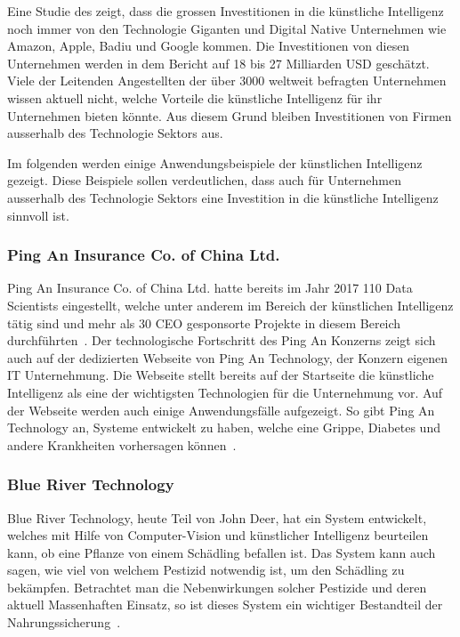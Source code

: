 Eine Studie des \textcite{Bughin} zeigt, dass die grossen Investitionen in die künstliche Intelligenz noch immer von den Technologie Giganten und Digital Native Unternehmen wie Amazon, Apple, Badiu und Google kommen. Die Investitionen von diesen Unternehmen werden in dem Bericht auf 18 bis 27 Milliarden USD geschätzt. Viele der Leitenden Angestellten der über 3000 weltweit befragten Unternehmen wissen aktuell nicht, welche Vorteile die künstliche Intelligenz für ihr Unternehmen bieten könnte. Aus diesem Grund bleiben Investitionen von Firmen ausserhalb des Technologie Sektors aus.

Im folgenden werden einige Anwendungsbeispiele der künstlichen Intelligenz gezeigt. Diese Beispiele sollen verdeutlichen, dass auch für Unternehmen ausserhalb des Technologie Sektors eine Investition in die künstliche Intelligenz sinnvoll ist.

\subsubsection{Ping An Insurance Co. of China Ltd.}

Ping An Insurance Co. of China Ltd. hatte bereits im Jahr 2017 110 Data Scientists eingestellt, welche unter anderem im Bereich der künstlichen Intelligenz tätig sind und mehr als 30 CEO gesponsorte Projekte in diesem Bereich durchführten~\autocite{Ransbotham2017}. Der technologische Fortschritt des Ping An Konzerns zeigt sich auch auf der dedizierten Webseite von Ping An Technology, der Konzern eigenen IT Unternehmung. Die Webseite stellt bereits auf der Startseite die künstliche Intelligenz als eine der wichtigsten Technologien für die Unternehmung vor. Auf der Webseite werden auch einige Anwendungsfälle aufgezeigt. So gibt Ping An Technology an, Systeme entwickelt zu haben, welche eine Grippe, Diabetes und andere Krankheiten vorhersagen können~\autocite{PingAnTechnology}.

\subsubsection{Blue River Technology}


Blue River Technology, heute Teil von John Deer, hat ein System entwickelt, welches mit Hilfe von Computer-Vision und künstlicher Intelligenz beurteilen kann, ob eine Pflanze von einem Schädling befallen ist. Das System kann auch sagen, wie viel von welchem Pestizid notwendig ist, um den Schädling zu bekämpfen. Betrachtet man die Nebenwirkungen solcher Pestizide und deren aktuell Massenhaften Einsatz, so ist dieses System ein wichtiger Bestandteil der Nahrungssicherung~\autocite{BlueRiverTechnology}.

